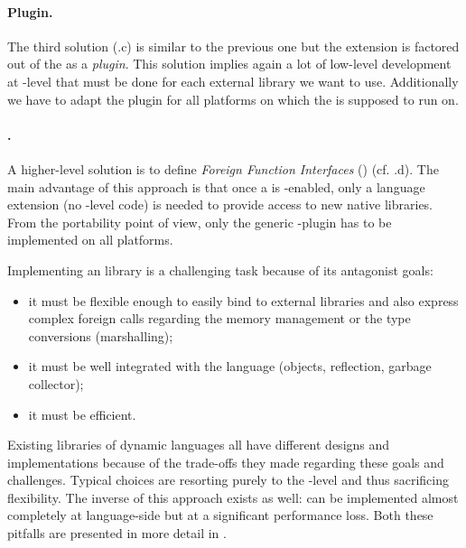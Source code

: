 \paragraph{\VM Plugin.}
The third solution (.c) is similar to the previous one but the extension is factored out of the \VM as a \emph{plugin}.
This solution implies again a lot of low-level development at \VM-level that must be done for each external library we want to use.
Additionally we have to adapt the plugin for all platforms on which the \VM is supposed to run on.

\paragraph{\FFI.}
A higher-level solution is to define \emph{Foreign Function Interfaces} (\FFIs) (cf. .d).
The main advantage of this approach is that once a \VM is \FFI-enabled, only a language extension (no \VM-level code) is needed to provide access to new native libraries.
From the portability point of view, only the generic \FFI \VM-plugin has to be implemented on all platforms.

Implementing an \FFI library is a challenging task because of its antagonist goals:
\begin{itemize}
    \item it must be flexible enough to easily bind to external libraries and also express complex foreign calls regarding the memory management or the type conversions (marshalling);
    \item it must be well integrated with the language (objects, reflection, garbage collector);
    \item it must be efficient.
\end{itemize}
%
Existing \FFI libraries of dynamic languages all have different designs and implementations because of the trade-offs they made regarding these goals and challenges.
Typical choices are resorting purely to the \VM-level and thus sacrificing flexibility.
The inverse of this approach exists as well: \FFIs can be implemented almost completely at language-side but at a significant performance loss.
Both these pitfalls are presented in more detail in .




